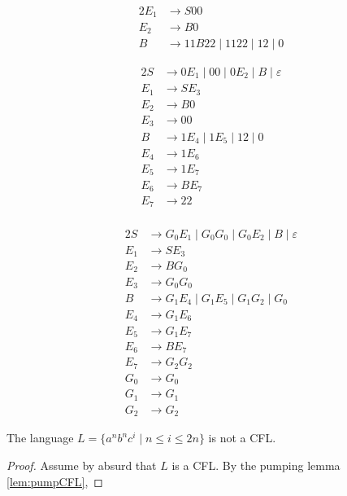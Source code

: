 \documentclass[docid=TP10]{tcom_TP}
\begin{document}
{\begin{center}
\begin{minipage}[c]{0.3\textwidth}
\begin{alignat*}{2}
	E_1 &\rightarrow S00\\
	E_2 &\rightarrow B0\\
	B &\rightarrow 11B22\mid 1122\mid 12\mid 0
\end{alignat*} \end{minipage}%
\begin{minipage}[c]{0.3\textwidth} \begin{alignat*}{2}
	S &\rightarrow 0E_1\mid 00\mid 0E_2\mid B\mid \varepsilon\\
	E_1 &\rightarrow SE_3\\
	E_2 &\rightarrow B0\\
	E_3 &\rightarrow 00\\
	B &\rightarrow 1E_4\mid 1E_5\mid 12\mid 0\\
	E_4 &\rightarrow 1E_6\\
	E_5 &\rightarrow 1E_7 \\
	E_6 &\rightarrow BE_7\\
	E_7 &\rightarrow 22\\
\end{alignat*} \end{minipage}%
\begin{minipage}[c]{0.4\textwidth} \begin{alignat*}{2}
	S &\rightarrow G_0E_1\mid G_0G_0\mid G_0E_2\mid B\mid \varepsilon\\
	E_1 &\rightarrow SE_3\\
	E_2 &\rightarrow BG_0\\
	E_3 &\rightarrow G_0G_0\\
	B &\rightarrow G_1E_4\mid G_1E_5\mid G_1G_2\mid G_0\\
	E_4 &\rightarrow G_1E_6\\
	E_5 &\rightarrow G_1E_7 \\
	E_6 &\rightarrow BE_7\\
	E_7 &\rightarrow G_2G_2\\
	G_0 &\rightarrow G_0\\
	G_1 &\rightarrow G_1\\
	G_2 &\rightarrow G_2
\end{alignat*} \end{minipage}
\end{center}
\begin{theorem}
The language $L=\{a^nb^nc^i\mid n \leq i \leq 2n\}$ is not a CFL.
\end{theorem}
\begin{proof}
Assume by absurd that $L$ is a CFL. By the pumping lemma \eqref{lem:pumpCFL},

\end{proof}}
\end{document}
